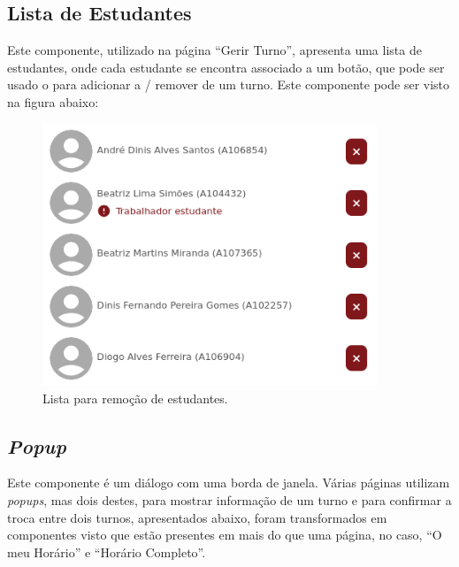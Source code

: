 \documentclass[12pt, a4paper]{article}
\begin{document}
\subsection{Lista de Estudantes}

Este componente, utilizado na página ``Gerir Turno'', apresenta uma lista de estudantes, onde cada
estudante se encontra associado a um botão, que pode ser usado o para adicionar a / remover de um
turno. Este componente pode ser visto na figura abaixo:

\begin{figure}[H]
    \centering
    \includegraphics[width=10cm]{res/components/student-list.png}
    \caption{Lista para remoção de estudantes.}
    \label{student-list}
\end{figure}

\subsection{\emph{Popup}}

Este componente é um diálogo com uma borda de janela. Várias páginas utilizam \emph{popups}, mas
dois destes, para mostrar informação de um turno e para confirmar a troca entre dois turnos,
apresentados abaixo, foram transformados em componentes visto que estão presentes em mais do que uma
página, no caso, ``O meu Horário'' e ``Horário Completo''.
\end{document}
